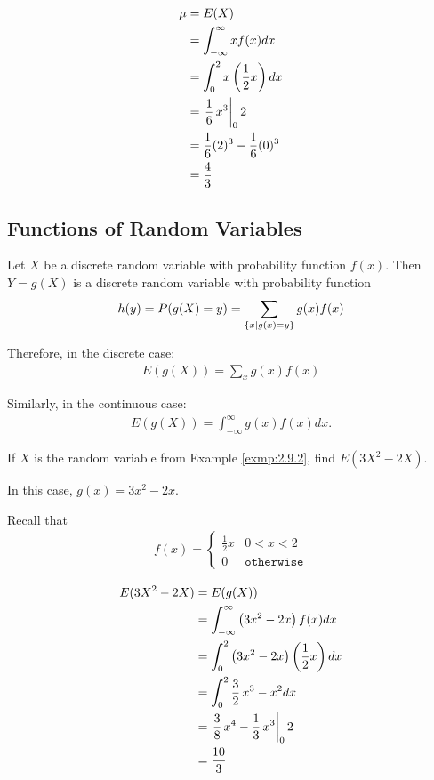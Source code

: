 {}
\begin{align}
 \mu &= E(X)\\ & = \int_{-\infty}^{\infty} xf(x) dx \\
  &= \int_{0}^{2} x\left( \dfrac{1}{2}x \right) dx\\
  &= \left. \frac{1}{6} \, x^{3} \right|_{0}{2}\\
  &= \frac{1}{6}(2)^{3}-\frac{1}{6}(0)^{3} \\
  &= \frac{4}{3}
\end{align}

\subsection{Functions of Random Variables}

 Let $X$ be a discrete random variable with probability function $f(x).$ Then $Y=g(X)$ is a discrete random variable with probability function
 \begin{align}
  h(y)=P(g(X)=y)=\sum_{\left\{ x|g(x)=y \right\}}g(x)f(x)
 \end{align}

 Therefore, in the discrete case:
 \begin{align}
 \label{eq:2.9.5}
  E\left( g(X) \right)=
  \sum_{x}g(x)f(x)
 \end{align}

 Similarly, in the continuous case:
 \begin{align}
  \label{eq:2.9.6}
  E\left( g(X) \right)=\int_{-\infty}^{\infty}
  g(x)f(x)dx.
 \end{align}

 \begin{ejemplo}
  \label{exmp:2.9.3}
  If $X$ is the random variable from Example \ref{exmp:2.9.2}, find $E\left( 3X^{2}-2X \right).$
 \end{ejemplo}

{}
In this case, $g(x)=3x^2-2x.$

Recall that
  \begin{align}
   f(x)=
   \begin{cases}
    \frac{1}{2}x & 0<x<2 \\
    0 & \texttt{otherwise}
   \end{cases}
  \end{align}

\begin{align}
 E(3X^2-2X) &= E(g(X)) \\
  &= \displaystyle \int_{-\infty}^{\infty} \left( 3x^2-2x \right)f(x)dx\\
  &= \displaystyle \int_{0}^{2}\left( 3x^2-2x \right)\left( \dfrac{1}{2}x \right)dx \\
  &= \displaystyle \int_{0}^{2} \frac{3}{2} \, x^{3} - x^{2} dx
 \\  &= \displaystyle \left. \frac{3}{8} \, x^{4} - \frac{1}{3} \, x^{3}
 \right|_{0}{2}
\\  &= \displaystyle
\frac{10}{3}
\end{align}

